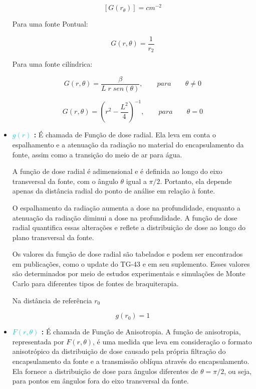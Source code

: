 \documentclass[11pt,a4paper]{article}
\newcounter{exemplo}
\begin{document}
\begin{exemplo}[onde,]
\begin{itemize}
					$$[G(r_ \theta)] = cm^{-2}$$

					Para uma fonte Pontual:

					\begin{equation}
						G(r, \theta) = \frac{1}{r_2}
					\end{equation}

					Para uma fonte cilíndrica:

					\begin{equation}
						G(r, \theta) = \frac{\beta}{L \; r \; sen(\theta)}, \qquad para \qquad \theta \neq 0
					\end{equation}

					\begin{equation}
						G(r, \theta) = \left(r^2 - \frac{L^2}{4}\right)^{-1}, \qquad para \qquad \theta = 0
					\end{equation}
				
				\item \textbf{\textcolor{DarkTurquoise}{$g(r)$} : } É chamada de Função de dose radial. Ela leva em conta o espalhamento e a atenuação da radiação no material do encapsulamento da fonte, assim como a transição do meio de ar para água.

				A função de dose radial é adimensional e é definida ao longo do eixo transversal da fonte, com o ângulo $\theta$ igual a $\pi / 2$. Portanto, ela depende apenas da distância radial do ponto de análise em relação à fonte.
				
				O espalhamento da radiação aumenta a dose na profundidade, enquanto a atenuação da radiação diminui a dose na profundidade. A função de dose radial quantifica essas alterações e reflete a distribuição de dose ao longo do plano transversal da fonte.
				
				Os valores da função de dose radial são tabelados e podem ser encontrados em publicações, como o update do TG-43 e em seu suplemento. Esses valores são determinados por meio de estudos experimentais e simulações de Monte Carlo para diferentes tipos de fontes de braquiterapia.
				
					Na distância de referência $r_0$

					$$g(r_0) = 1$$
				
				\item \textbf{\textcolor{DarkTurquoise}{$F(r, \theta)$} : } É chamada de Função de Anisotropia. A função de anisotropia, representada por $F(r, \theta)$, é uma medida que leva em consideração o formato anisotrópico da distribuição de dose causado pela própria filtração do encapsulamento da fonte e a transmissão oblíqua através do encapsulamento. Ela fornece a distribuição de dose para ângulos diferentes de $\theta = \pi / 2$, ou seja, para pontos em ângulos fora do eixo transversal da fonte.


\end{itemize}
\end{exemplo}
\end{document}

